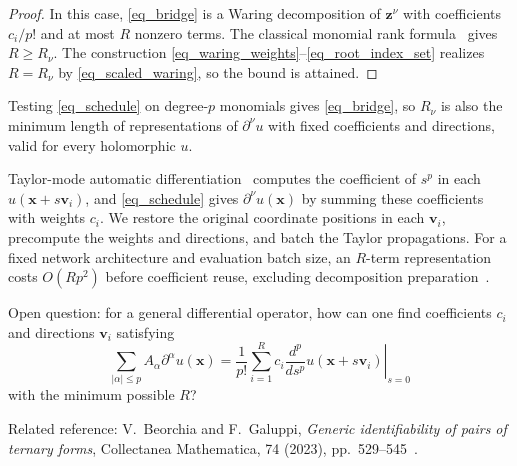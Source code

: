 \documentclass[final,oneeqnum]{siamltex}
\newcommand{\C}{\mathbb{C}}
\newcommand{\bx}{\bm{x}}
\newcommand{\bz}{\bm{z}}
\newcommand{\bv}{\bm{v}}
\newcommand{\abs}[1]{\left|#1\right|}
\begin{document}
\begin{proof}
    In this case, \eqref{eq_bridge} is a Waring decomposition of $\bz^\nu$ with coefficients $c_i / p!$ and at most $R$ nonzero terms.
    The classical monomial rank formula~\cite[Cor.~3.3 and Remark~2.3]{CCG2012} gives $R \geq R_\nu$.
    The construction \eqref{eq_waring_weights}--\eqref{eq_root_index_set} realizes $R = R_\nu$ by \eqref{eq_scaled_waring}, so the bound is attained.
\end{proof}

Testing \eqref{eq_schedule} on degree-$p$ monomials gives \eqref{eq_bridge}, so $R_\nu$ is also the minimum length of representations of $\partial^\nu u$ with fixed coefficients and directions, valid for every holomorphic $u$.

Taylor-mode automatic differentiation~\cite{Shi2024stde} computes the coefficient of $s^p$ in each $u(\bx + s \bv_i)$, and \eqref{eq_schedule} gives $\partial^\nu u(\bx)$ by summing these coefficients with weights $c_i$.
We restore the original coordinate positions in each $\bv_i$, precompute the weights and directions, and batch the Taylor propagations.
For a fixed network architecture and evaluation batch size, an $R$-term representation costs $O(R p^2)$ before coefficient reuse, excluding decomposition preparation~\cite[Sec.~4.2]{Shi2024stde}.

{
\color{blue}
\bigskip
Open question: for a general differential operator, how can one find coefficients $c_i$ and directions $\bv_i$ satisfying
\begin{equation*}
    \sum_{\abs{\alpha} \leq p} A_{\alpha} \partial^\alpha u(\bx) = \frac{1}{p!} \sum_{i = 1}^{R} c_i \left.\frac{d^p}{d s^p} u(\bx + s \bv_i)\right|_{s = 0}
\end{equation*}
with the minimum possible $R$?

Related reference: V.~Beorchia and F.~Galuppi, \emph{Generic identifiability of pairs of ternary forms}, Collectanea Mathematica, 74 (2023), pp.~529--545~\cite{BeorchiaGaluppi2023}.
}

\end{document}
